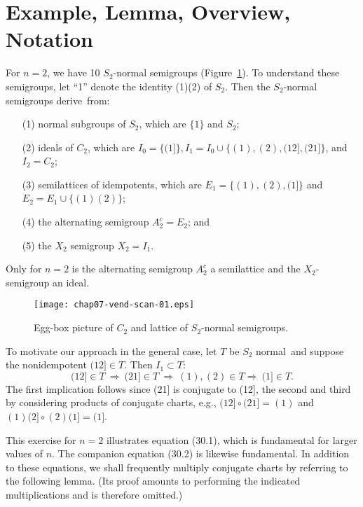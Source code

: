 \documentclass{surv-l}
\numberwithin{equation}{section}
\numberwithin{table}{section}
\numberwithin{figure}{section}
\theoremstyle{definition}
\begin{document}
\setcounter{section}{27}
\section{Example, Lemma, Overview, Notation}\label{sec7.28}

For $n =2$, we have 10 $S_{2}$-normal semigroups
(Figure~\ref{fig7.28.1}). To understand these semigroups, let ``1''
denote the identity (1)(2) of $S_{2}$. Then the $S_{2}$-normal
semigroups derive~from:
\begin{enumerate}
\item[(1)] normal subgroups of $S_{2}$, which are $\{1\}$ and $S_{2}$;

\item[(2)] ideals of $C_{2}$, which are $I_{0}=\{(1]\},
I_{1}=I_{0}\cup\{(1), (2), (12], (21]\}$, and $I_{2}=C_{2}$;

\item[(3)] semilattices of idempotents, which are $E_{1}=\{(1),(2),(1]\}$ and $E_{2}=E_{1}\cup\{(1)(2)\}$;

\item[(4)] the alternating semigroup $A_{2}^{c}=E_{2}$; and

\item[(5)] the $X_{2}$ semigroup $X_{2}=I_{1}$.
\end{enumerate}
Only for $n =2$ is the alternating semigroup $A_{2}^{c}$ a
semilattice and the $X_{2}$-semigroup an ideal.

\begin{figure}[!h]
\texttt{[image: chap07-vend-scan-01.eps]}
\caption{Egg-box picture of $C_{2}$ and lattice of $S_{2}$-normal
semigroups.\label{fig7.28.1}}
\end{figure}

To motivate our approach in the general case, let $T$ be $S_{2}$
normal~and suppose the nonidempotent $(12]\in T$. Then
$I_{1}\subset T$:
\[
(12]\in T\ \Rightarrow\ (21]\in T\ \Rightarrow\ (1), (2) \in T\Rightarrow\ (1]\in T.
\]
The first implication follows since (21] is conjugate to (12], the
second and third by considering products of conjugate charts,
e.g., $(12]\circ (21] =(1)$ and $(1)(2]\circ(2)(1]=(1]$.

This exercise for $n =2$ illustrates equation (30.1), which is
fundamental for larger values of $n$. The companion equation
(30.2) is likewise fundamental. In addition to these equations, we
shall frequently multiply conjugate charts by referring to the
following lemma. (Its proof amounts to performing the indicated
multiplications and is therefore omitted.)
\end{document}

